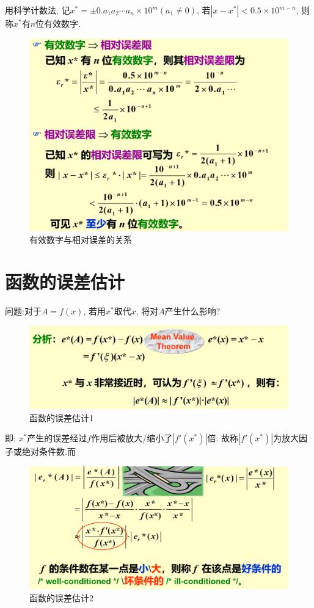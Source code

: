 \documentclass[lang=cn,newtx,12pt,scheme=chinese]{elegantbook}
\begin{document}
用科学计数法, 记$x^*=\pm0.a_1a_2\cdots a_n\times10^m(a_1\neq0)$, 若$|x-x^*|<0.5\times10^{m-n}$, 则称$x^*$有$n$位有效数字.
\begin{figure}[H]
	\centering
	\includegraphics[width=0.7\linewidth]{image/误差5}
	\caption{有效数字与相对误差的关系}
	\label{fig:5}
\end{figure}
\section{函数的误差估计}
问题:对于$A=f(x)$, 若用$x^*$取代$x$, 将对$A$产生什么影响?
\begin{figure}[H]
	\centering
	\includegraphics[width=0.8\linewidth]{image/误差6}
	\caption{函数的误差估计1}
	\label{fig:6}
\end{figure}
即: $x^*$产生的误差经过$f$作用后被放大/缩小了$|f'(x^*)|$倍. 故称$|f'(x^*)|$为放大因子或绝对条件数.而
\begin{figure}[H]
	\centering
	\includegraphics[width=0.8\linewidth]{image/误差7}
	\caption{函数的误差估计2}
	\label{fig:7}
\end{figure}
\end{document}
